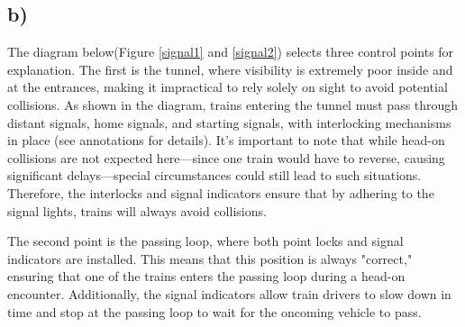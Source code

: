\documentclass[letterpaper,12pt,leqno]{article}
\begin{document}
\subsection{b)}
The diagram below(Figure \ref{signal1} and \ref{signal2}) selects three control points for explanation. The first is the tunnel, where visibility is extremely poor inside and at the entrances, making it impractical to rely solely on sight to avoid potential collisions. As shown in the diagram, trains entering the tunnel must pass through distant signals, home signals, and starting signals, with interlocking mechanisms in place (see annotations for details). It's important to note that while head-on collisions are not expected here—since one train would have to reverse, causing significant delays—special circumstances could still lead to such situations. Therefore, the interlocks and signal indicators ensure that by adhering to the signal lights, trains will always avoid collisions.

The second point is the passing loop, where both point locks and signal indicators are installed. This means that this position is always "correct," ensuring that one of the trains enters the passing loop during a head-on encounter. Additionally, the signal indicators allow train drivers to slow down in time and stop at the passing loop to wait for the oncoming vehicle to pass.
\end{document}
